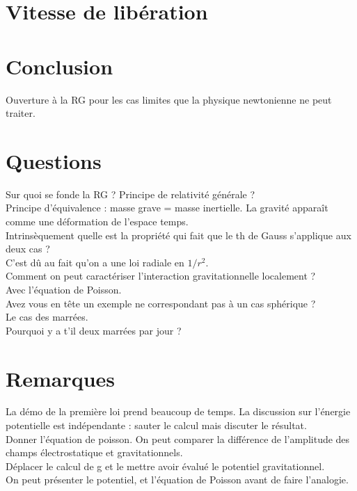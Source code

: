 \documentclass[12pt,prb,aps,epsf]{article}
\begin{document}
\section{Vitesse de libération}

\section{Conclusion}
Ouverture à la RG pour les cas limites que la physique newtonienne ne peut traiter.


\section*{Questions}
Sur quoi se fonde la RG ? Principe de relativité générale ?\\
Principe d'équivalence : masse grave = masse inertielle. La gravité apparaît comme une déformation de l'espace temps.\\

Intrinsèquement quelle est la propriété qui fait que le th de Gauss s'applique aux deux cas ?\\
C'est dû au fait qu'on a une loi radiale en $1/r^2$.\\

Comment on peut caractériser l'interaction gravitationnelle localement ?\\
Avec l'équation de Poisson.\\

Avez vous en tête un exemple ne correspondant pas à un cas sphérique ?\\
Le cas des marrées.\\

Pourquoi y a t'il deux marrées par jour ?\\




\section*{Remarques}
La démo de la première loi prend beaucoup de temps. La discussion sur l'énergie potentielle est indépendante : sauter le calcul mais discuter le résultat.\\

Donner l'équation de poisson. On peut comparer la différence de l'amplitude des champs électrostatique et gravitationnels.\\

Déplacer le calcul de g et le mettre avoir évalué le potentiel gravitationnel.\\

On peut présenter le potentiel, et l'équation de Poisson avant de faire l'analogie.



	
	
	
\end{document}
